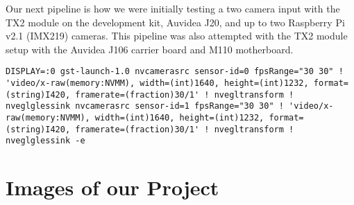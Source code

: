\documentclass[letterpaper,10pt,serif,draftclsnofoot,onecolumn,compsoc,titlepage]{IEEEtran}
\begin{document}
Our next pipeline is how we were initially testing a two camera input with the TX2 module 
on the development kit, Auvidea J20, and up to two Raspberry Pi v2.1 (IMX219) cameras. 
This pipeline was also attempted with the TX2 module setup with the Auvidea J106 carrier
board and M110 motherboard. \\

\begin{lstlisting}
DISPLAY=:0 gst-launch-1.0 nvcamerasrc sensor-id=0 fpsRange="30 30" ! 'video/x-raw(memory:NVMM), width=(int)1640, height=(int)1232, format=(string)I420, framerate=(fraction)30/1' ! nvegltransform ! nveglglessink nvcamerasrc sensor-id=1 fpsRange="30 30" ! 'video/x-raw(memory:NVMM), width=(int)1640, height=(int)1232, format=(string)I420, framerate=(fraction)30/1' ! nvegltransform ! nveglglessink -e
\end{lstlisting}
\cite{TwoCamPipe}


\section{Images of our Project}




\nocite{*}
\newpage


\end{document}
